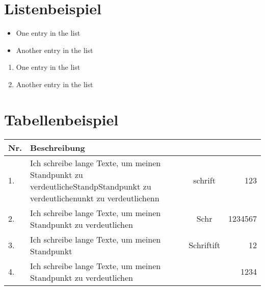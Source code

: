 \documentclass[10pt,a4paper]{article}
\begin{document}
\maketitle
\newpage
{}
\tableofcontents
\newpage
{}

\section{Listenbeispiel}
    \begin{itemize}
        \item One entry in the list
        \item Another entry in the list
    \end{itemize}
    \begin{enumerate}
        \item One entry in the list
        \item Another entry in the list
    \end{enumerate}

\section{Tabellenbeispiel}
    \begin{tabularx}{\textwidth}{|l|X|c|r|}
        \hline
        \textbf{Nr.} & \textbf{Beschreibung} & &\\
        \hline
        1. & Ich schreibe lange Texte, um meinen Standpunkt zu verdeutlicheStandpStandpunkt zu verdeutlichenunkt zu verdeutlichenn  & schrift  &  123 \\
        \hline
        2. & Ich schreibe lange Texte, um meinen Standpunkt zu verdeutlichen  & Schr  &   1234567 \\
        \hline
        3. & Ich schreibe lange Texte, um meinen Standpunkt   & Schriftift  &   12 \\
        \hline
        4. & Ich schreibe lange Texte, um meinen Standpunkt zu verdeutlichen  &   &   1234 \\
        \hline
    \end{tabularx}
\end{document}
